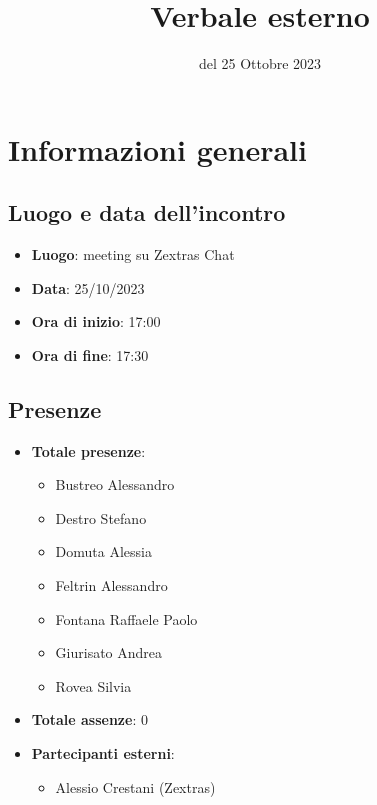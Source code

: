 \documentclass[12pt]{article}
\title{Verbale esterno}
\date{del 25 Ottobre 2023}
\begin{document}
	\makefirstpage
	
	
	\clearpage
	
	\tableofcontents
	\clearpage

    \section{Informazioni generali}
    
    \subsection{Luogo e data dell'incontro}
    
    \begin{itemize}
    	\item \textbf{Luogo}: meeting su Zextras Chat
    	\item \textbf{Data}: 25/10/2023
    	\item \textbf{Ora di inizio}: 17:00
    	\item \textbf{Ora di fine}: 17:30
    \end{itemize}
    
    \subsection{Presenze}
    
    \begin{itemize}
    	\item \textbf{Totale presenze}:
    	\begin{itemize}
    		\item Bustreo Alessandro
    		\item Destro Stefano
    		\item Domuta Alessia 
    		\item Feltrin Alessandro 
    		\item Fontana Raffaele Paolo 
    		\item Giurisato Andrea 
    		\item Rovea Silvia
    	\end{itemize}
    	
    	\item \textbf{Totale assenze}: 0
    	
    	\item \textbf{Partecipanti esterni}:
    	
    	\begin{itemize}
    		\item Alessio Crestani (Zextras)
    	\end{itemize}
    \end{itemize}
    
\end{document}
